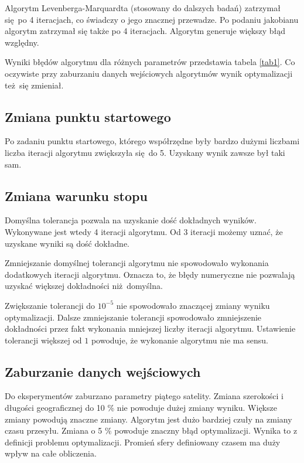 \documentclass[]{article}
\begin{document}
Algorytm Levenberga-Marquardta (stosowany do dalszych badań) zatrzymał się po 4 iteracjach, co świadczy o jego znacznej przewadze. Po podaniu jakobianu
algorytm zatrzymał się także po 4 iteracjach. Algorytm generuje większy błąd względny.

Wyniki błędów algorytmu dla różnych parametrów przedstawia tabela \ref{tab1}. Co oczywiste przy zaburzaniu danych wejściowych algorytmów wynik optymalizacji też się zmieniał.

\subsection{Zmiana punktu startowego}
Po zadaniu punktu startowego, którego współrzędne były bardzo dużymi liczbami liczba iteracji algorytmu zwiększyła się do 5. Uzyskany wynik zawsze był taki sam.
\subsection{Zmiana warunku stopu}
Domyślna tolerancja pozwala na uzyskanie dość dokładnych wyników. Wykonywane jest wtedy 4 iteracji algorytmu. Od 3 iteracji możemy uznać, że uzyskane wyniki są dość dokładne.

Zmniejszanie domyślnej tolerancji algorytmu nie spowodowało wykonania dodatkowych iteracji algorytmu. Oznacza to, że błędy numeryczne nie pozwalają uzyskać większej dokładności niż domyślna.

Zwiększanie tolerancji do $10^{-5}$ nie spowodowało znaczącej zmiany wyniku optymalizacji. Dalsze zmniejszanie tolerancji spowodowało zmniejszenie dokładności przez fakt wykonania mniejszej liczby iteracji algorytmu. Ustawienie tolerancji większej od $1$ powoduje, że wykonanie algorytmu nie ma sensu.

\subsection{Zaburzanie danych wejściowych}
Do eksperymentów zaburzano parametry piątego satelity. Zmiana szerokości i długości geograficznej do 10 \% nie powoduje dużej zmiany wyniku. Większe zmiany powodują znaczne zmiany. Algorytm jest dużo bardziej czuły na zmiany czasu przesyłu. Zmiana o 5 \% powoduje znaczny błąd optymalizacji. Wynika to z definicji problemu optymalizacji. Promień sfery definiowany czasem ma duży wpływ na całe obliczenia.
\end{document}
